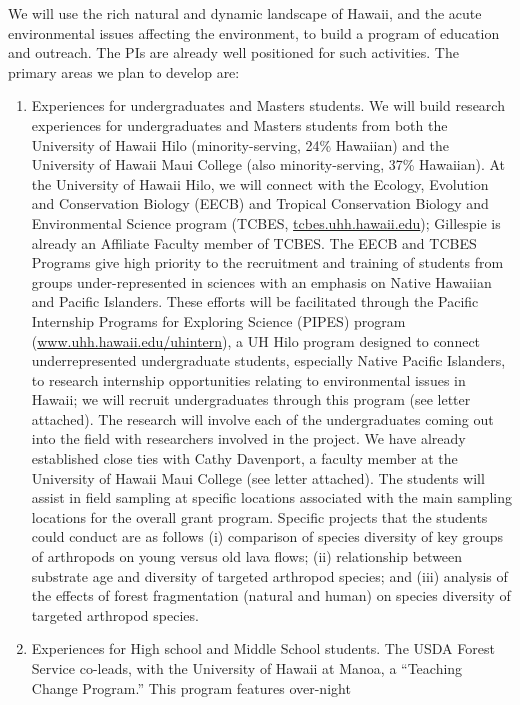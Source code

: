 \documentclass[11pt]{article}
\begin{document}
We will use the rich natural and dynamic landscape of Hawaii, and the
acute environmental issues affecting the environment, to build a
program of education and outreach. The PIs are already well positioned
for such activities. The primary areas we plan to develop are:
\begin{enumerate}
\item Experiences for undergraduates and Masters students. We will build
  research experiences for undergraduates and Masters students from
  both the University of Hawaii Hilo (minority-serving, 24\% Hawaiian)
  and the University of Hawaii Maui College (also minority-serving,
  37\% Hawaiian). At the University of Hawaii Hilo, we will connect
  with the Ecology, Evolution and Conservation Biology (EECB) and
  Tropical Conservation Biology and Environmental Science program
  (TCBES, \url{tcbes.uhh.hawaii.edu}); Gillespie is already an
  Affiliate Faculty member of TCBES. The EECB and TCBES Programs give
  high priority to the recruitment and training of students from
  groups under-represented in sciences with an emphasis on Native
  Hawaiian and Pacific Islanders. These efforts will be facilitated
  through the Pacific Internship Programs for Exploring Science
  (PIPES) program (\url{www.uhh.hawaii.edu/uhintern}), a UH
  Hilo program designed to connect underrepresented undergraduate
  students, especially Native Pacific Islanders, to research
  internship opportunities relating to environmental issues in Hawaii;
  we will recruit undergraduates through this program (see letter
  attached). The research will involve each of the undergraduates
  coming out into the field with researchers involved in the
  project. We have already established close ties with Cathy
  Davenport, a faculty member at the University of Hawaii Maui College
  (see letter attached). The students will assist in field sampling at
  specific locations associated with the main sampling locations for
  the overall grant program. Specific projects that the students could
  conduct are as follows (i) comparison of species diversity of key
  groups of arthropods on young versus old lava flows; (ii)
  relationship between substrate age and diversity of targeted
  arthropod species; and (iii) analysis of the effects of forest
  fragmentation (natural and human) on species diversity of targeted
  arthropod species.
\item Experiences for High school and Middle School students. The USDA
  Forest Service co-leads, with the University of Hawaii at Manoa, a
  ``Teaching Change Program.'' This program features over-night

\end{enumerate}
\end{document}
